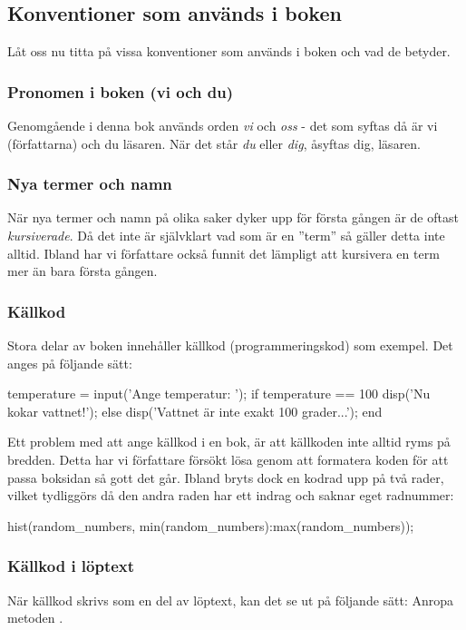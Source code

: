 \subsection{Konventioner som används i boken}
Låt oss nu titta på vissa konventioner som används i boken och vad de betyder.

\subsubsection{Pronomen i boken (vi och du)}
Genomgående i denna bok används orden \emph{vi} och \emph{oss} - det som syftas då är vi (författarna) och du läsaren. När det står \emph{du} eller \emph{dig}, åsyftas dig, läsaren.

\subsubsection{Nya termer och namn}
När nya termer och namn på olika saker dyker upp för första gången är de oftast \emph{kursiverade}. Då det inte är självklart vad som är en ''term'' så gäller detta inte alltid. Ibland har vi författare också funnit det lämpligt att kursivera en term mer än bara första gången.

\subsubsection{Källkod}
Stora delar av boken innehåller källkod (programmeringskod) som exempel. Det anges på följande sätt:

\begin{matlab}[caption={Exempel på källkod},label={}]
temperature = input('Ange temperatur: ');
if temperature == 100
    disp('Nu kokar vattnet!');
else
    disp('Vattnet är inte exakt 100 grader...');
end
\end{matlab}

Ett problem med att ange källkod i en bok, är att källkoden inte alltid ryms på bredden. Detta har vi författare försökt lösa genom att formatera koden för att passa boksidan så gott det går. Ibland bryts dock en kodrad upp på två rader, vilket tydliggörs då den andra raden har ett indrag och saknar eget radnummer:


\begin{matlab}
hist(random_numbers, min(random_numbers):max(random_numbers));
\end{matlab}

\subsubsection{Källkod i löptext}
När källkod skrivs som en del av löptext, kan det se ut på följande sätt: Anropa metoden .

